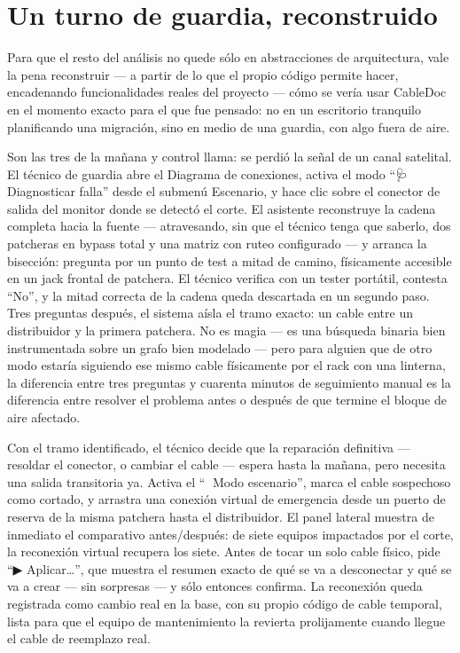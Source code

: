 \documentclass[11pt,twocolumn]{article}
\begin{document}
\section{Un turno de guardia, reconstruido}

Para que el resto del análisis no quede sólo en abstracciones de arquitectura, vale la pena reconstruir --- a partir de lo que el propio código permite hacer, encadenando funcionalidades reales del proyecto --- cómo se vería usar CableDoc en el momento exacto para el que fue pensado: no en un escritorio tranquilo planificando una migración, sino en medio de una guardia, con algo fuera de aire.

Son las tres de la mañana y control llama: se perdió la señal de un canal satelital. El técnico de guardia abre el Diagrama de conexiones, activa el modo ``🩺 Diagnosticar falla'' desde el submenú Escenario, y hace clic sobre el conector de salida del monitor donde se detectó el corte. El asistente reconstruye la cadena completa hacia la fuente --- atravesando, sin que el técnico tenga que saberlo, dos patcheras en bypass total y una matriz con ruteo configurado --- y arranca la bisección: pregunta por un punto de test a mitad de camino, físicamente accesible en un jack frontal de patchera. El técnico verifica con un tester portátil, contesta ``No'', y la mitad correcta de la cadena queda descartada en un segundo paso. Tres preguntas después, el sistema aísla el tramo exacto: un cable entre un distribuidor y la primera patchera. No es magia --- es una búsqueda binaria bien instrumentada sobre un grafo bien modelado --- pero para alguien que de otro modo estaría siguiendo ese mismo cable físicamente por el rack con una linterna, la diferencia entre tres preguntas y cuarenta minutos de seguimiento manual es la diferencia entre resolver el problema antes o después de que termine el bloque de aire afectado.

Con el tramo identificado, el técnico decide que la reparación definitiva --- resoldar el conector, o cambiar el cable --- espera hasta la mañana, pero necesita una salida transitoria ya. Activa el ``🧪 Modo escenario'', marca el cable sospechoso como cortado, y arrastra una conexión virtual de emergencia desde un puerto de reserva de la misma patchera hasta el distribuidor. El panel lateral muestra de inmediato el comparativo antes/después: de siete equipos impactados por el corte, la reconexión virtual recupera los siete. Antes de tocar un solo cable físico, pide ``▶ Aplicar…'', que muestra el resumen exacto de qué se va a desconectar y qué se va a crear --- sin sorpresas --- y sólo entonces confirma. La reconexión queda registrada como cambio real en la base, con su propio código de cable temporal, lista para que el equipo de mantenimiento la revierta prolijamente cuando llegue el cable de reemplazo real.
\end{document}

